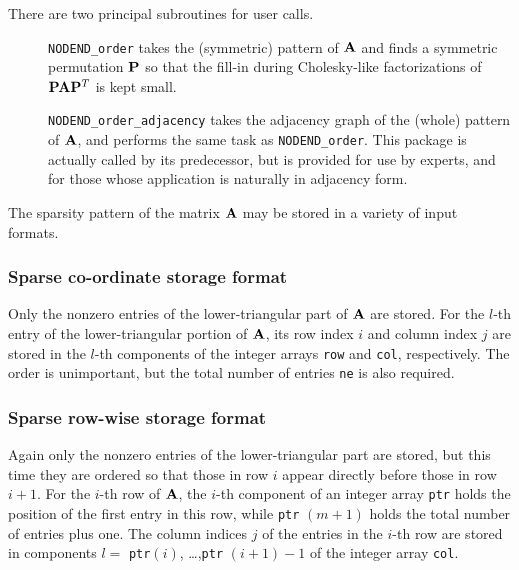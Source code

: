 \documentclass{galahad}
\newcommand{\packagename}{NODEND}
\begin{document}
\noindent There are two principal subroutines for user calls.

\begin{description}

\item[] {\tt \packagename\_order} takes the (symmetric) pattern of ${\mathbf{A}}$
 and finds a symmetric permutation ${\mathbf{P}}$ so that the fill-in
 during Cholesky-like factorizations of ${\mathbf{P}} {\mathbf{A}} {\mathbf{P}}^T$
 is kept small.

\item[] {\tt \packagename\_order\_adjacency} takes the adjacency graph of 
 the (whole) pattern of ${\mathbf{A}}$, and performs the same task as
 {\tt \packagename\_order}. This package is actually called
 by its predecessor, but is provided for use by experts, and for
 those whose application is naturally in adjacency form.
\end{description}


\galmatrix
The sparsity pattern of the matrix ${\mathbf{A}}$ may be stored in 
a variety of input formats.

\subsubsection{Sparse co-ordinate storage format}\label{coordinate}
Only the nonzero entries of the lower-triangular part of ${\mathbf{A}}$ are stored.
For the $l$-th entry of the lower-triangular portion of ${\mathbf{A}}$,
its row index $i$ and column index $j$
are stored in the $l$-th components of the integer arrays 
{\tt row} and {\tt col}, respectively.
The order is unimportant, but the total number of entries
{\tt ne} is also required.

\subsubsection{Sparse row-wise storage format}\label{rowwise}
Again only the nonzero entries of the lower-triangular part are stored,
but this time they are ordered so that those in row $i$ appear directly
before those in row $i+1$. For the $i$-th row of ${\mathbf{A}}$, the $i$-th component
of an integer array {\tt ptr} holds the position of the first entry in this row,
while {\tt ptr} $(m+1)$ holds the total number of entries plus one.
The column indices $j$ of the entries in the $i$-th row are 
stored in components $l =$ {\tt ptr}$(i)$, \ldots ,{\tt ptr} $(i+1)-1$ 
of the integer array {\tt col}.
\end{document}
